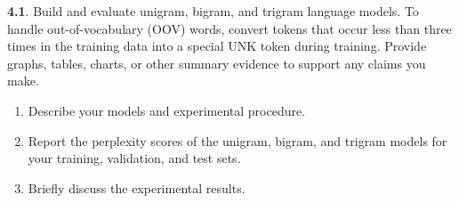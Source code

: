 \textbf{4.1}. Build and evaluate unigram, bigram, and trigram language models. To handle out-of-vocabulary (OOV) words, convert tokens that occur less than three times in the training data into a special UNK token during training. Provide graphs, tables, charts, or other summary evidence to support any claims you make.

\begin{enumerate}
    \item Describe your models and experimental procedure.
	
    \item Report the perplexity scores of the unigram, bigram, and trigram models for your training, validation, and test sets.
	
    \item Briefly discuss the experimental results. 
	
\end{enumerate}
